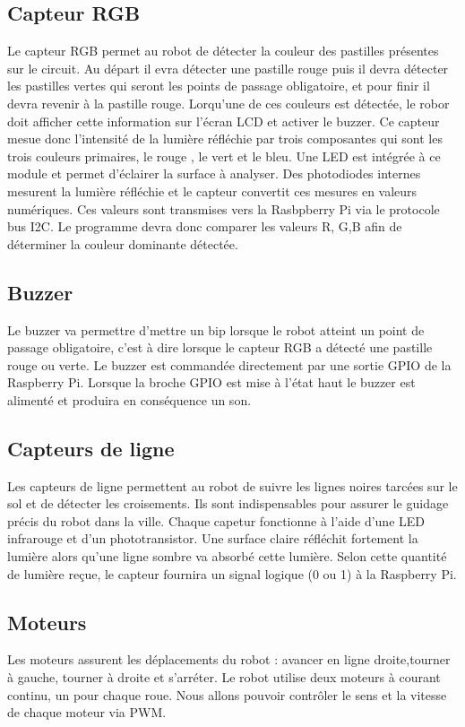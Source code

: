 \subsection{Capteur RGB}
Le capteur RGB permet au robot de détecter la couleur des pastilles présentes sur le circuit. Au départ il evra détecter une pastille rouge puis il devra détecter les pastilles vertes qui seront les points de passage obligatoire, et pour finir il devra revenir à la pastille rouge. Lorqu'une de ces couleurs est détectée, le robor doit afficher cette information sur l'écran LCD et activer le buzzer.
Ce capteur mesue donc l'intensité de la lumière réfléchie par trois composantes qui sont les trois couleurs primaires, le rouge , le vert et le bleu. Une LED est intégrée à ce module et permet d'éclairer la surface à analyser. Des photodiodes internes mesurent la lumière réfléchie et le capteur convertit ces mesures en valeurs numériques. Ces valeurs sont transmises vers la Rasbpberry Pi via le protocole bus I2C. 
Le programme devra donc comparer les valeurs R, G,B afin de déterminer la couleur dominante détectée.

\subsection{Buzzer}
Le buzzer va permettre d'mettre un bip lorsque le robot atteint un point de passage obligatoire, c'est à dire lorsque le capteur RGB a détecté une pastille rouge ou verte.
Le buzzer est commandée directement par une sortie GPIO de la Raspberry Pi. Lorsque la broche GPIO est mise à l'état haut le buzzer est alimenté et produira en conséquence un son. 

\subsection{Capteurs de ligne }
Les capteurs de ligne permettent au robot de suivre les lignes noires tarcées sur le sol et de détecter les croisements. Ils sont indispensables pour assurer le guidage précis du robot dans la ville.
Chaque capetur fonctionne à l'aide d'une LED infrarouge et d'un phototransistor. Une surface claire réfléchit fortement la lumière alors qu'une ligne sombre va absorbé cette lumière. Selon cette quantité de lumière reçue, le capteur fournira un signal logique (0 ou 1) à la Raspberry Pi. 

\subsection{Moteurs}
Les moteurs assurent les déplacements du robot : avancer en ligne droite,tourner à gauche, tourner à droite et s'arréter.
Le robot utilise deux moteurs à courant continu, un pour chaque roue. Nous allons pouvoir contrôler le sens et la vitesse de chaque moteur via PWM.

